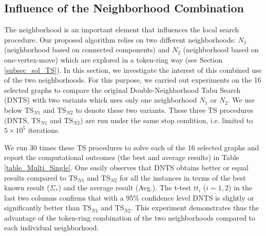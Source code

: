 \documentclass{elsart}
\begin{document}
\subsection{Influence of the Neighborhood Combination}
\label{subsec_sol_influence_neighborhood_combination}

The neighborhood is an important element that influences the local search procedure. Our proposed algorithm relies on two different neighborhoods: $N_1$ (neighborhood based on connected components) and $N_2$ (neighborhood based on one-vertex-move) which are explored in a token-ring way (see Section \ref{subsec_sol_TS}). In this section, we investigate the interest of this combined use of the two neighborhoods. For this purpose, we carried out experiments on the 16 selected graphs to compare the original Double-Neighborhood Tabu Search (DNTS) with two variants which uses only one neighborhood $N_1$ or $N_2$. We use below TS$_{N1}$ and TS$_{N2}$ to denote these two variants. These three TS procedures (DNTS, TS$_{N1}$ and TS$_{N2}$) are run under the same stop condition, i.e. limited to $5 \times 10^5 $ iterations.

We run 30 times these TS procedures to solve each of the 16 selected graphs and report the computational outcomes (the best and average results) in Table \ref{table_Multi_Single}. One easily observes that DNTS obtains better or equal results compared to TS$_{N1}$ and TS$_{N2}$ for all the instances in terms of the best known result ($\Sigma_*$) and the average result (Avg.). The t-test \emph{$tt_i$} ($i = 1, 2$) in the last two columns confirms that with a 95\% confidence level DNTS is slightly or significantly better than  TS$_{N1}$ and TS$_{N2}$. This experiment demonstrates thus the advantage of the token-ring combination of the two neighborhoods compared to each individual neighborhood.
\end{document}
